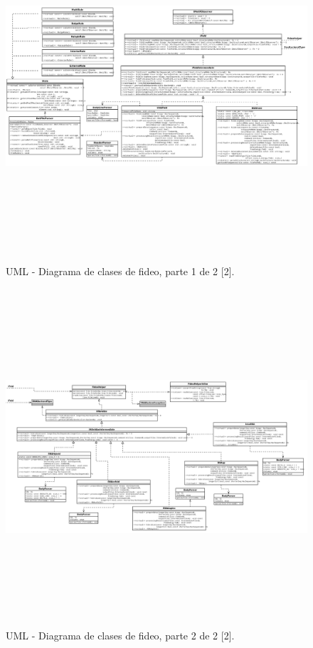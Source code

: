 \begin{figure}[!hbtp]
	\begin{center}
		\includegraphics[width=20.5cm, height=13cm, angle=90]{image/fideoclass1.png}
		\caption{UML - Diagrama de clases de fideo, parte 1 de 2 [2].}
		\label{fideoDisenio1}
	\end{center}
\end{figure}

\begin{figure}[!hbtp]
	\begin{center}
		\includegraphics[width=20.5cm, height=12.5cm, angle=90]{image/fideoclass2.png}
		\caption{UML - Diagrama de clases de fideo, parte 2 de 2 [2].}
		\label{fideoDisenio2}
	\end{center}
\end{figure}